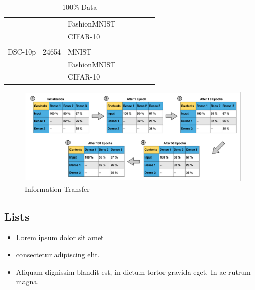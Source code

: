 \usepackage{}\documentclass{article}
\begin{document}
\begin{table}[]
\begin{tabular}{@{}llllllll@{}}
                            &                            & FashionMNIST             &                  &              &               &          &                               \\
                            &                            & CIFAR-10                 &                  &              &               &          &                               \\
                            &                            &                          &                  &              &               &          &                               \\
DSC-10p                     & 24654                      & MNIST                    &                  &              &               &          &                               \\
                            &                            & FashionMNIST             &                  &              &               &          &                               \\
                            &                            & CIFAR-10                 &                  &              &               &          &                               \\ \bottomrule
\end{tabular}
\caption{100\% Data}
\label{tab:my-table}
\end{table}



\begin{figure}[h!]
\centering
\includegraphics[scale=0.08]{InfoTransfer.png}
\caption{Information Transfer}
\label{fig:infotransfer}
\end{figure}


\subsection{Lists}
\begin{itemize}
\item Lorem ipsum dolor sit amet
\item consectetur adipiscing elit. 
\item Aliquam dignissim blandit est, in dictum tortor gravida eget. In ac rutrum magna.
\end{itemize}
\end{document}
